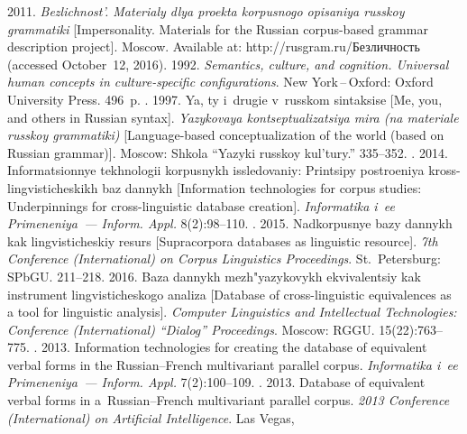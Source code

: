 \begin{multicols}{2}
{{\begin{thebibliography}{99}
 2011. \textit{Bezlichnost'. Materialy dlya proekta korpusnogo 
opisaniya russkoy grammatiki} [Impersonality. Materials for the Russian corpus-based grammar 
description project]. Moscow. Available at: {\sf http://\linebreak rusgram.ru/Безличность} (accessed 
October~12, 2016).
 1992. \textit{Semantics, culture, and cognition. Universal human 
concepts in culture-specific configurations}. New York\,--\,Oxford: Oxford University Press. 
496~p.
. 1997. Ya, ty i~drugie v~russkom sintaksise 
[Me, 
you, and others in Russian syntax]. \textit{Yazykovaya kontseptualizatsiya mira (na materiale 
russkoy grammatiki)} [Language-based conceptualization of the world (based on Russian 
grammar)]. Moscow: Shkola ``Yazyki russkoy kul'tury.'' 335--352.
. 2014. 
Informatsionnye tekhnologii korpusnykh issledovaniy: Printsipy postroeniya  
kross-lingvisticheskikh baz dannykh [Information technologies for corpus studies: 
Underpinnings for cross-linguistic database creation]. \textit{Informatika i~ee Primeneniya~--- 
Inform. Appl.} 8(2):98--110.
. 2015. 
Nadkorpusnye bazy dannykh kak lingvisticheskiy resurs [Supracorpora databases as linguistic 
resource]. \textit{7th Conference 
(International) on Corpus Linguistics Proceedings}. St.\ Petersburg: SPbGU. 211--218.
 2016. Baza dannykh mezh"\-yazy\-ko\-vykh ekvivalentsiy kak 
instrument ling\-vi\-sti\-che\-sko\-go analiza [Database of cross-linguistic equivalences as a tool for 
linguistic analysis]. \textit{Computer Linguistics and Intellectual 
Technologies: Conference (International) ``Dialog'' Proceedings}. Moscow: RGGU.  
15(22):763--775.
. 2013. 
Information technologies for creating the database of equivalent verbal forms in the  
Russian--French multivariant parallel corpus. \textit{Informatika i~ee Primeneniya~--- Inform. 
Appl.} 7(2):100--109.
. 
2013. Database of equivalent verbal forms in a~Russian--French multivariant parallel corpus. 
\textit{2013  Conference (International) on Artificial Intelligence}. Las Vegas,

\end{thebibliography}}}
\end{multicols}
